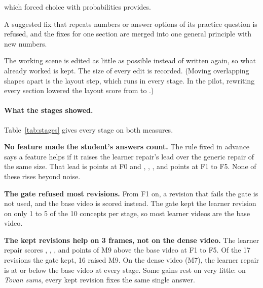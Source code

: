 \documentclass[11pt]{article}
\begin{document}
\begin{description}
  which forced choice with probabilities provides.
  \item[F4, stop teaching the practice test.] A suggested fix that repeats numbers or answer options of its practice
  question is refused, and the fixes for one section are merged into one general principle with new numbers.
  \item[F5, edit instead of rewrite.] The working scene is edited as little as possible instead of written again, so
  what already worked is kept. The size of every edit is recorded. (Moving overlapping shapes apart is the layout
  step, which runs in every stage. In the pilot, rewriting every section lowered the layout score from
  \PilotLayoutBase{} to \PilotLayoutAll{}.)
\end{description}

\DiagSBFL
{}

\paragraph{What the stages showed.} Table~\ref{tab:stages} gives every stage on both measures.

\textbf{No feature made the student's answers count.} The rule fixed in advance says a feature helps if it raises the
learner repair's lead over the generic repair of the same size. That lead is \NMRepairGeneric{} points at F0 and
\NMStageOneGeneric{}, \NMStageTwoGeneric{}, \NMStageThreeGeneric{}, \NMStageFourGeneric{} and \NMStageFiveGeneric{}
points at F1 to F5. None of these rises beyond noise.

\textbf{The gate refused most revisions.} From F1 on, a revision that fails the gate is not used, and the base video is
scored instead. The gate kept the learner revision on only 1 to 5 of the 10 concepts per stage, so most learner videos
are the base video.

\textbf{The kept revisions help on 3 frames, not on the dense video.} The learner repair scores \NMStageOne{},
\NMStageTwo{}, \NMStageThree{}, \NMStageFour{} and \NMStageFive{} points of M9 above the base video at F1 to F5. Of
the 17 revisions the gate kept, 16 raised M9. On the dense video (M7), the learner repair is at or below the base video
at every stage. Some gains rest on very little: on \emph{Tovan sums}, every kept revision fixes the same single answer.
\end{document}
